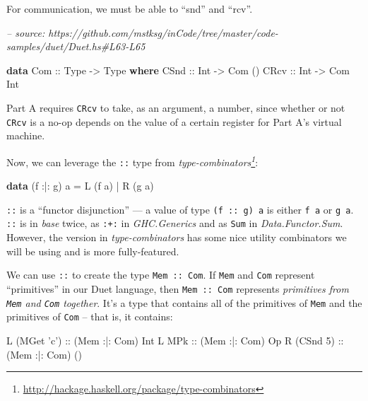 \documentclass[]{article}
\newenvironment{Shaded}{}{}
\newcommand{\CharTok}[1]{\textcolor[rgb]{0.25,0.44,0.63}{#1}}
\newcommand{\CommentTok}[1]{\textcolor[rgb]{0.38,0.63,0.69}{\textit{#1}}}
\newcommand{\DataTypeTok}[1]{\textcolor[rgb]{0.56,0.13,0.00}{#1}}
\newcommand{\DecValTok}[1]{\textcolor[rgb]{0.25,0.63,0.44}{#1}}
\newcommand{\FunctionTok}[1]{\textcolor[rgb]{0.02,0.16,0.49}{#1}}
\newcommand{\KeywordTok}[1]{\textcolor[rgb]{0.00,0.44,0.13}{\textbf{#1}}}
\newcommand{\NormalTok}[1]{#1}
\newcommand{\OtherTok}[1]{\textcolor[rgb]{0.00,0.44,0.13}{#1}}
\renewcommand{\href}[2]{#2\footnote{\url{#1}}}
\begin{document}
For communication, we must be able to ``snd'' and ``rcv''.

\begin{Shaded}
\begin{Highlighting}[]
\CommentTok{-- source: https://github.com/mstksg/inCode/tree/master/code-samples/duet/Duet.hs#L63-L65}

\KeywordTok{data} \DataTypeTok{Com}\OtherTok{ ::} \DataTypeTok{Type} \OtherTok{->} \DataTypeTok{Type} \KeywordTok{where}
    \DataTypeTok{CSnd}\OtherTok{ ::} \DataTypeTok{Int} \OtherTok{->} \DataTypeTok{Com}\NormalTok{ ()}
    \DataTypeTok{CRcv}\OtherTok{ ::} \DataTypeTok{Int} \OtherTok{->} \DataTypeTok{Com} \DataTypeTok{Int}
\end{Highlighting}
\end{Shaded}

Part A requires \texttt{CRcv} to take, as an argument, a number, since whether
or not \texttt{CRcv} is a no-op depends on the value of a certain register for
Part A's virtual machine.

Now, we can leverage the \texttt{:\textbar{}:} type from
\emph{\href{http://hackage.haskell.org/package/type-combinators}{type-combinators}}:

\begin{Shaded}
\begin{Highlighting}[]
\KeywordTok{data}\NormalTok{ (f }\FunctionTok{:|:}\NormalTok{ g) a }\FunctionTok{=} \DataTypeTok{L}\NormalTok{ (f a)}
                 \FunctionTok{|} \DataTypeTok{R}\NormalTok{ (g a)}
\end{Highlighting}
\end{Shaded}

\texttt{:\textbar{}:} is a ``functor disjunction'' --- a value of type
\texttt{(f\ :\textbar{}:\ g)\ a} is either \texttt{f\ a} or \texttt{g\ a}.
\texttt{:\textbar{}:} is in \emph{base} twice, as \texttt{:+:} in
\emph{GHC.Generics} and as \texttt{Sum} in \emph{Data.Functor.Sum}. However, the
version in \emph{type-combinators} has some nice utility combinators we will be
using and is more fully-featured.

We can use \texttt{:\textbar{}:} to create the type
\texttt{Mem\ :\textbar{}:\ Com}. If \texttt{Mem} and \texttt{Com} represent
``primitives'' in our Duet language, then \texttt{Mem\ :\textbar{}:\ Com}
represents \emph{primitives from \texttt{Mem} and \texttt{Com} together}. It's a
type that contains all of the primitives of \texttt{Mem} and the primitives of
\texttt{Com} -- that is, it contains:

\begin{Shaded}
\begin{Highlighting}[]
\DataTypeTok{L}\NormalTok{ (}\DataTypeTok{MGet} \CharTok{'c'}\NormalTok{)}\OtherTok{ ::}\NormalTok{ (}\DataTypeTok{Mem} \FunctionTok{:|:} \DataTypeTok{Com}\NormalTok{) }\DataTypeTok{Int}
\DataTypeTok{L} \DataTypeTok{MPk}\OtherTok{        ::}\NormalTok{ (}\DataTypeTok{Mem} \FunctionTok{:|:} \DataTypeTok{Com}\NormalTok{) }\DataTypeTok{Op}
\DataTypeTok{R}\NormalTok{ (}\DataTypeTok{CSnd} \DecValTok{5}\NormalTok{)}\OtherTok{   ::}\NormalTok{ (}\DataTypeTok{Mem} \FunctionTok{:|:} \DataTypeTok{Com}\NormalTok{) ()}
\end{Highlighting}
\end{Shaded}
\end{document}

